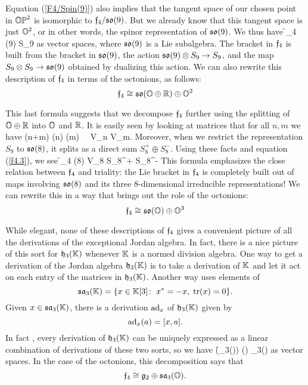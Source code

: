 Equation (\ref{F4/Spin(9)}) also implies that the tangent space of our
chosen point in ${\mathbb {OP}}^2$ is isomorphic to ${\mathfrak {f}}_4/{\mathfrak {so}}(9)$.  But we already
know that this tangent space is just ${\mathbb O}^2$, or in other words, the
spinor representation of ${\mathfrak {so}}(9)$.  We thus have
\be   \f_4 \iso \so(9) \oplus S_9    \label{f4.3}   \ee   
as vector spaces, where ${\mathfrak {so}}(9)$ is a Lie subalgebra.  The bracket in  
${\mathfrak {f}}_4$ is built from the bracket in ${\mathfrak {so}}(9)$, the action ${\mathfrak {so}}(9) \otimes  
S_9 \to S_9$, and the map $S_9 \otimes S_9 \to {\mathfrak {so}}(9)$  obtained by  
dualizing this action.  We can also rewrite this description
of ${\mathfrak {f}}_4$ in terms of the octonions, as follows:   
\[   {\mathfrak {f}}_4 \cong {\mathfrak {so}}({\mathbb O} \oplus {\mathbb R}) \oplus {\mathbb O}^2    \label{f4.4}   \]
   
This last formula suggests that we decompose ${\mathfrak {f}}_4$ further using the   
splitting of ${\mathbb O} \oplus {\mathbb R}$ into ${\mathbb O}$ and ${\mathbb R}$.   
It is easily seen by looking at matrices that for all $n,m$ we have    
\be     
\so(n+m) \iso \so(n) \oplus \so(m) \, \oplus\, V_n \tensor V_m.    
\label{so(n+m)} \ee   
Moreover, when we restrict the representation  
$S_9$ to ${\mathfrak {so}}(8)$, it splits as a direct sum $S_8^+ \oplus S_8^-$.  
Using these facts and equation (\ref{f4.3}), we see  
\be      
\f_4 \iso \so(8) \oplus V_8 \oplus S_8^+ \oplus S_8^-     
\label{f4.5}   
\ee   
This formula emphasizes the close relation between ${\mathfrak {f}}_4$ and triality:   
the Lie bracket in ${\mathfrak {f}}_4$ is completely built out of maps involving   
${\mathfrak {so}}(8)$ and its three 8-dimensional irreducible representations!     
We can rewrite this in a way that brings out the role of the octonions:   
\[
{\mathfrak {f}}_4 \cong {\mathfrak {so}}({\mathbb O}) \oplus {\mathbb O}^3    
\label{f4.6}    
\]
  
While elegant, none of these descriptions of ${\mathfrak {f}}_4$ gives a  convenient
picture of all the derivations of the exceptional Jordan algebra.   In
fact, there is a nice picture of this sort for ${\mathfrak {h}}_3({\mathbb K})$ whenever ${\mathbb K}$
is a normed division algebra.    One way to get a derivation of the
Jordan algebra ${\mathfrak {h}}_3({\mathbb K})$ is to take a derivation of ${\mathbb K}$  and let it
act on each entry of the matrices in ${\mathfrak {h}}_3({\mathbb K})$.  Another way uses
elements of 
\[    {\mathfrak {sa}}_3({\mathbb K}) = \{  x \in {\mathbb K}[3] \colon \; x^* = -x,\; {\rm tr}(x) = 0 \}  .\]
Given $x \in {\mathfrak {sa}}_3({\mathbb K})$, there is a derivation ${\rm ad}_x$ of ${\mathfrak {h}}_3({\mathbb K})$ given 
by
\[          {\rm ad}_x (a) = [x,a]   .\]   
In fact \cite{BS}, every derivation of ${\mathfrak {h}}_3({\mathbb K})$ can be uniquely 
expressed as a linear combination of derivations of these two sorts,
so we have 
\be   \Der(\h_3(\K)) \iso \Der(\K) \oplus \sa_3(\K)   \label{der(h3K)} \ee
as vector spaces.   In the case of the octonions, this decomposition 
says that
\[        {\mathfrak {f}}_4 \cong {\mathfrak {g}}_2 \oplus {\mathfrak {sa}}_3({\mathbb O}) .     \label{f4.7} \]

